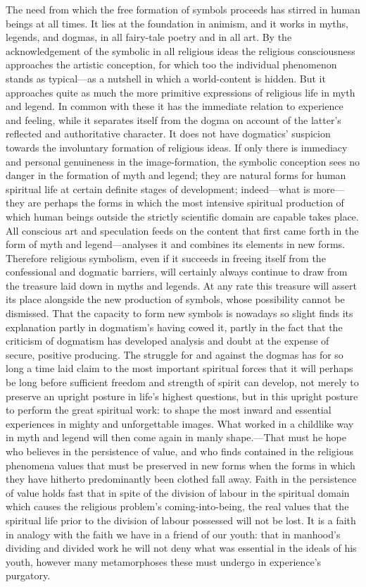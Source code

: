 \documentclass[12pt,a4paper]{book}
\newcommand{\opage}[1]{\marginnote{\footnotesize\textit{[#1]}}}
\begin{document}
The need from which the free formation of symbols proceeds has stirred in human beings at all times. It
lies at the foundation in 
\opage{140}animism, and it works in myths, legends, and dogmas, in all fairy-tale poetry
and in all art. By the acknowledgement of the symbolic in all religious ideas the religious consciousness
approaches the artistic conception, for which too the individual phenomenon stands as typical---as a
nutshell in which a world-content is hidden. But it approaches quite as much the more primitive
expressions of religious life in myth and legend. In common with these it has the immediate relation to
experience and feeling, while it separates itself from the dogma on account of the latter's reflected and
authoritative character. It does not have dogmatics' suspicion towards the involuntary formation of
religious ideas. If only there is immediacy and personal genuineness in the image-formation, the symbolic
conception sees no danger in the formation of myth and legend; they are natural forms for human spiritual
life at certain definite stages of development; indeed---what is more---they are perhaps the forms in
which the most intensive spiritual production of which human beings outside the strictly scientific domain
are capable takes place. All conscious art and speculation feeds on the content that first came forth in
the form of myth and legend---analyses it and combines its elements in new forms. Therefore religious
symbolism, even if it succeeds in freeing itself from the confessional and dogmatic barriers, will
certainly always continue to draw from the treasure laid down in myths and legends. At any rate this
treasure will assert its place alongside the new production of symbols, whose possibility cannot be
dismissed. That the capacity to form new symbols is nowadays so slight finds its explanation partly in
dogmatism's having cowed it, partly in the fact that the criticism of dogmatism has developed analysis and
doubt at the expense of secure, positive producing. The struggle for and against the dogmas has for so
long a time laid claim to the most important spiritual forces that it will perhaps be long before
sufficient freedom and strength of spirit can develop, not merely to preserve an upright posture in life's
highest questions, but in this upright posture to perform the great spiritual work: to shape the most
inward and essential experiences in mighty and unforgettable images. What worked in a childlike way in
myth and legend will then come again in manly shape.---That must he hope who believes in the persistence
of value, and who finds contained in the religious phenomena values that must be preserved in new forms
when the forms in which they have hitherto predominantly been clothed fall away. Faith 
\opage{141}in the persistence
of value holds fast that in spite of the division of labour in the spiritual domain which causes the
religious problem's coming-into-being, the real values that the spiritual life prior to the division of
labour possessed will not be lost. It is a faith in analogy with the faith we have in a friend of our
youth: that in manhood's dividing and divided work he will not deny what was essential in the ideals of
his youth, however many metamorphoses these must undergo in experience's purgatory.
\end{document}
